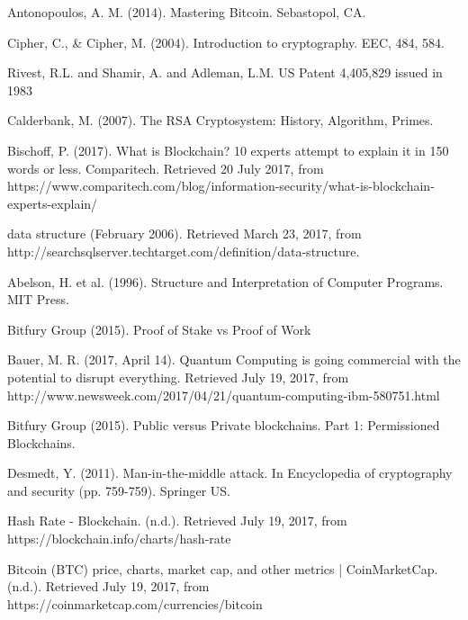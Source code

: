 \begin{thebibliography}{99}



{\sc Antonopoulos, A. M.} (2014).
Mastering Bitcoin.
{\em} Sebastopol, CA.

Cipher, C., \& Cipher, M. (2004). Introduction to cryptography. EEC, 484, 584.

Rivest, R.L. and Shamir, A. and Adleman, L.M. US Patent 4,405,829 issued in 1983

Calderbank, M. (2007). The RSA Cryptosystem: History, Algorithm, Primes.

Bischoff, P. (2017). What is Blockchain? 10 experts attempt to explain it in 150 words or less. Comparitech. Retrieved 20 July 2017, from https://www.comparitech.com/blog/information-security/what-is-blockchain-experts-explain/

{\sc data structure} (February 2006). Retrieved March 23, 2017, from http://searchsqlserver.techtarget.com/definition/data-structure.

{\sc Abelson, H. et al.} (1996).
Structure and Interpretation of Computer Programs.
MIT Press.

Bitfury Group (2015). Proof of Stake vs Proof of Work

Bauer, M. R. (2017, April 14). Quantum Computing is going commercial with the potential to disrupt everything. Retrieved July 19, 2017, from http://www.newsweek.com/2017/04/21/quantum-computing-ibm-580751.html

Bitfury Group (2015). Public versus Private blockchains. Part 1: Permissioned Blockchains.

Desmedt, Y. (2011). Man-in-the-middle attack. In Encyclopedia of cryptography and security (pp. 759-759). Springer US.

Hash Rate - Blockchain. (n.d.). Retrieved July 19, 2017, from https://blockchain.info/charts/hash-rate

Bitcoin (BTC) price, charts, market cap, and other metrics | CoinMarketCap. (n.d.). Retrieved July 19, 2017, from https://coinmarketcap.com/currencies/bitcoin


\end{thebibliography}
